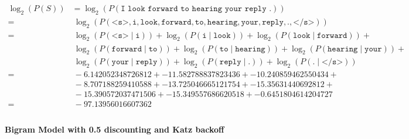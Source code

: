 \documentclass{article}
\begin{document}
\begin{equation}
\begin{split}
\log_{2} (P(S)) &= \log_{2} (P(\texttt{I look forward to hearing your reply .})) \\ =&\ \log_{2} (P(\texttt{<s>}, \texttt{i}, \texttt{look}, \texttt{forward}, \texttt{to}, \texttt{hearing}, \texttt{your}, \texttt{reply}, \texttt{.}, \texttt{</s>})) \\ =&\ \log_{2} (P(\texttt{<s>} \mid \texttt{i})) + \log_{2} (P(\texttt{i} \mid \texttt{look})) + \log_{2} (P(\texttt{look} \mid \texttt{forward})) + \\ &\ \log_{2} (P(\texttt{forward} \mid \texttt{to})) + \log_{2} (P(\texttt{to} \mid \texttt{hearing})) + \log_{2} (P(\texttt{hearing} \mid \texttt{your})) + \\ &\ \log_{2} (P(\texttt{your} \mid \texttt{reply})) + \log_{2} (P(\texttt{reply} \mid \texttt{.})) + \log_{2} (P(\texttt{.} \mid \texttt{</s>})) \\ =&\ -6.142052348726812 + -11.582788837823436 + -10.240859462550434 + \\ &\ -8.707188259410588 + -13.725046665121754 + -15.35631440692812 + \\ &\ -15.390572037471506 + -15.349557686620518 + -0.6451804614204727 \\ =&\ -97.13956016607362 \\
\end{split}\end{equation}

\paragraph{Bigram Model with 0.5 discounting and Katz backoff}
\end{document}
